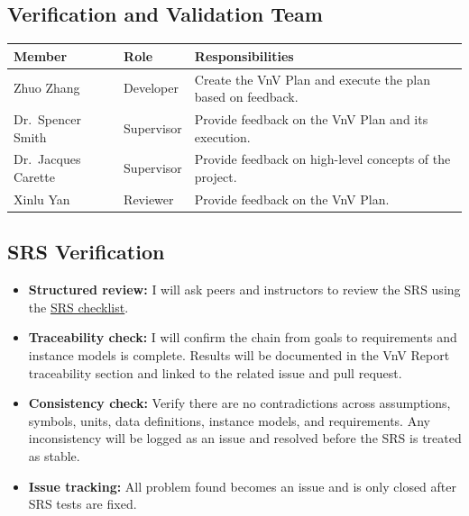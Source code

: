 \documentclass[12pt, titlepage]{article}
\providecommand{\wss}[1]{}
\begin{document}
\subsection{Verification and Validation Team}

\wss{Your teammates.  Maybe your supervisor.
  You should do more than list names.  You should say what each person's role is
  for the project's verification.  A table is a good way to summarize this information.}

\renewcommand{\arraystretch}{1.2}
\begin{tabularx}{\textwidth}{p{3.2cm}p{2.6cm}X}
\toprule
\textbf{Member} & \textbf{Role} & \textbf{Responsibilities}\\
\midrule
Zhuo Zhang & Developer & Create the VnV Plan and execute the plan based on feedback.\\
Dr.\ Spencer Smith & Supervisor & Provide feedback on the VnV Plan and its execution.\\
Dr.\ Jacques Carette & Supervisor & Provide feedback on high-level concepts of the project.\\
Xinlu Yan & Reviewer & Provide feedback on the VnV Plan.\\
\bottomrule
\end{tabularx}
\renewcommand{\arraystretch}{1.0}

\subsection{SRS Verification}

\begin{itemize}
  \item \textbf{Structured review:} I will ask peers and instructors to review the SRS using the
  \href{https://github.com/JoeZZG/CAS741/blob/main/docs/Checklists/SRS-Checklist.tex}{SRS checklist}.
  \item \textbf{Traceability check:} I will confirm the chain from goals to
  requirements and instance models is complete. Results will be documented in
  the VnV Report traceability section and linked to the related issue and pull
  request.
  \item \textbf{Consistency check:} Verify there are no contradictions across
  assumptions, symbols, units, data definitions, instance models, and
  requirements. Any inconsistency will be logged as an issue and resolved
  before the SRS is treated as stable.
  \item \textbf{Issue tracking:} All problem found becomes an issue and is only closed after SRS tests are fixed.
\end{itemize}
\end{document}

